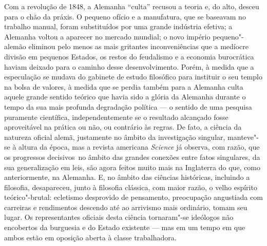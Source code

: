 Com a revolução de 1848, a Alemanha ``culta'' recusou a teoria e, do
alto, desceu para o chão da práxis. O pequeno ofício e a manufatura, que
se baseavam no trabalho manual, foram substituídos por uma grande
indústria efetiva; a Alemanha voltou a aparecer no mercado mundial; o
novo império pequeno"-alemão eliminou pelo
menos as mais gritantes inconveniências que a medíocre divisão em pequenos
Estados, os restos 
do feudalismo e a economia burocrática haviam deixado para o caminho
desse desenvolvimento. Porém, à medida que a especulação se
mudava do gabinete de estudo filosófico para instituir o seu templo na
bolsa de valores, à medida que se perdia também para a
Alemanha culta aquele grande sentido teórico que havia sido a glória da %
Alemanha durante o tempo da sua mais profunda degradação política --- o
sentido de uma pesquisa puramente científica, independentemente se o
resultado alcançado fosse aproveitável na prática ou não, ou contrário
às regras. De fato, a ciência da natureza oficial alemã, justamente no
âmbito da investigação singular, manteve"-se à altura da época, mas a
revista americana \emph{Science} já observa, com razão, que os
progressos decisivos\est\ no âmbito das grandes conexões entre fatos
singulares, da sua generalização em leis, são agora feitos muito mais na
Inglaterra do que, como anteriormente, na Alemanha. E, no âmbito das
ciências históricas, incluindo a filosofia, desapareceu, junto à
filosofia clássica, com maior razão, o velho 
espírito teórico"-brutal: ecletismo desprovido
de pensamento, preocupação angustiada com carreiras e rendimentos %
descendo até ao arrivismo  mais ordinário, tomam seu 
lugar. Os representantes oficiais desta ciência tornaram"-se ideólogos
não encobertos da burguesia e do Estado existente --- mas em um tempo em
que ambos estão em oposição aberta à classe trabalhadora.

